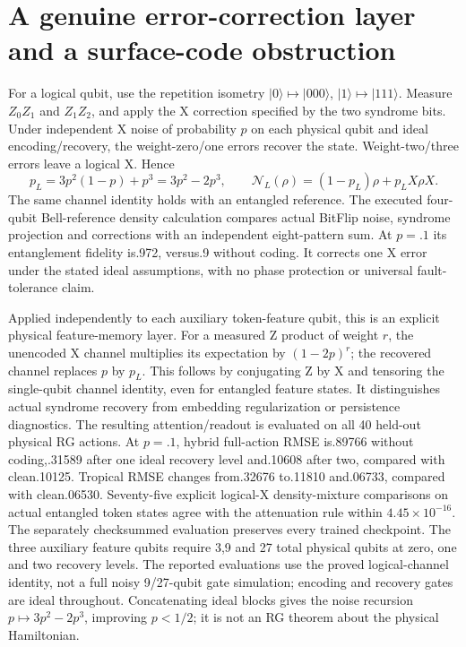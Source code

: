 \documentclass[11pt,oneside,openany]{book}
\theoremstyle{definition}\newtheorem{definition}[theorem]{Definition}
\theoremstyle{remark}\newtheorem{remark}[theorem]{Remark}
\begin{document}
\section{A genuine error-correction layer and a surface-code obstruction}
For a logical qubit, use the repetition isometry
$|0\rangle\mapsto|000\rangle $, $|1\rangle\mapsto|111\rangle $.
Measure $ Z_0 Z_1$ and $ Z_1 Z_2$, and apply the X correction specified by the
two syndrome bits. Under independent X noise of probability $ p $ on each
physical qubit and ideal encoding/recovery, the weight-zero/one errors
recover the state. Weight-two/three errors leave a logical X. Hence
\[
 p_L=3 p^2(1-p)+p^3=3 p^2-2 p^3,
 \qquad\mathcal N_L(\rho)=(1-p_L)\rho+p_LX\rho X.
\]
The same channel identity holds with an entangled reference. The executed
four-qubit Bell-reference density calculation compares actual BitFlip noise,
syndrome projection and corrections with an independent eight-pattern sum.
At $ p=.1$ its entanglement fidelity is.972, versus.9 without coding.
It corrects one X error under the stated ideal assumptions, with no phase
protection or universal fault-tolerance claim.

Applied independently to each auxiliary token-feature qubit, this is an
explicit physical feature-memory layer. For a measured Z product of weight
$ r $, the unencoded X channel multiplies its expectation by $(1-2 p)^r $;
the recovered channel replaces $ p $ by $ p_L $. This follows by conjugating Z
by X and tensoring the single-qubit channel identity, even for entangled
feature states. It distinguishes actual syndrome recovery from embedding
regularization or persistence diagnostics. The resulting attention/readout
is evaluated on all 40 held-out physical RG actions. At $ p=.1$, hybrid
full-action RMSE is.89766 without coding,.31589 after one ideal recovery
level and.10608 after two, compared with clean.10125. Tropical RMSE changes
from.32676 to.11810 and.06733, compared with clean.06530. Seventy-five
explicit logical-X density-mixture comparisons on actual entangled token
states agree with the attenuation rule within $4.45\times 10^{-16}$. The
separately checksummed evaluation preserves every trained checkpoint.
The three auxiliary feature qubits require 3,9 and 27 total physical qubits
at zero, one and two recovery levels. The reported evaluations use the
proved logical-channel identity, not a full noisy 9/27-qubit gate simulation;
encoding and recovery gates are ideal throughout.
Concatenating ideal
blocks gives the noise recursion $ p\mapsto 3 p^2-2 p^3$, improving $ p<1/2$;
it is not an RG theorem about the physical Hamiltonian.
\end{document}
